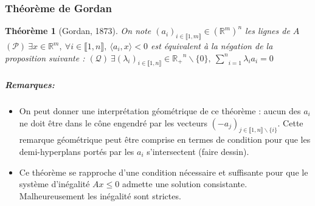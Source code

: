 \documentclass[10pt,a4paper]{article}
\newtheorem{thm}{Théorème}
\begin{document}
\subsubsection{Théorème de Gordan}
\begin{thm}[Gordan, 1873]
  On note $(a_i)_{i \in \llbracket 1,m \rrbracket} \in \left(\mathbb{R}^m \right)^n$ les lignes de $A$
  $(\mathcal{P}) \  \exists x \in \mathbb{R}^m, \ \forall i \in \llbracket 1,n \rrbracket, \ \langle a_i,x \rangle <0$ est équivalent à la négation de la proposition suivante : $ (\mathcal{Q}) \ \exists (\lambda_i)_{i \in \llbracket 1,n \rrbracket}\in \mathbb{R_+}^n \backslash\lbrace 0\rbrace, \ \underset{i=1}{\overset{n}{\sum}} \lambda_i a_i=0$
\end{thm}
\subparagraph{Remarques:}
\begin{itemize}
  \item
    On peut donner une interprétation géométrique de ce théorème : aucun des $a_i$ ne doit être dans le cône engendré par les vecteurs $(-a_j)_{j \in \llbracket 1,n \rrbracket \backslash \lbrace i \rbrace}$.
    Cette remarque géométrique peut être comprise en termes de condition pour que les demi-hyperplans portés par les $a_i$ s'intersectent (faire dessin).
  \item
    Ce théorème se rapproche d'une condition nécessaire et suffisante pour que le système d'inégalité $Ax \leq 0$ admette une solution consistante.
    Malheureusement les inégalité sont strictes.
\end{itemize}
\end{document}

